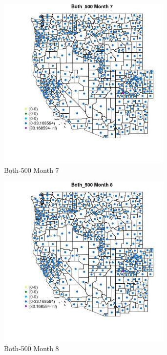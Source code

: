 \begin{figure} 
\centering  
\includegraphics[width=0.77\textwidth]{Code_Outputs/df_report_ML_predictors_CountyCentroid_Locations_Dates_2008-01-01to2018-12-31_MapObsMo7Both_500.jpg} 
\caption{\label{fig:df_report_ML_predictors_CountyCentroid_Locations_Dates_2008-01-01to2018-12-31MapObsMo7Both_500}Both-500 Month 7} 
\end{figure} 
 

\begin{figure} 
\centering  
\includegraphics[width=0.77\textwidth]{Code_Outputs/df_report_ML_predictors_CountyCentroid_Locations_Dates_2008-01-01to2018-12-31_MapObsMo8Both_500.jpg} 
\caption{\label{fig:df_report_ML_predictors_CountyCentroid_Locations_Dates_2008-01-01to2018-12-31MapObsMo8Both_500}Both-500 Month 8} 
\end{figure} 
 

